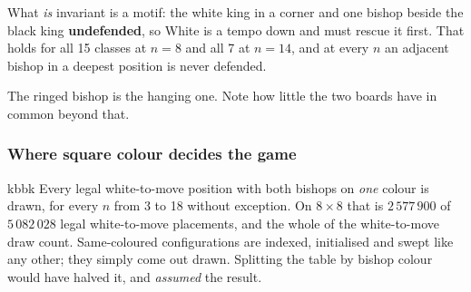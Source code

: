 \documentclass[10pt]{article}
\begin{document}
\noindent
What \emph{is} invariant is a motif: the white king in a corner and one bishop
beside the black king \textbf{undefended}, so White is a tempo down and must
rescue it first. That holds for all 15 classes at $n=8$ and all 7 at $n=14$,
and at every $n$ an adjacent bishop in a deepest position is never defended.

\medskip
\noindent
\begin{minipage}[t]{0.36\textwidth}
\end{minipage}\hfill
\begin{minipage}[t]{0.36\textwidth}
\end{minipage}\hfill
\begin{minipage}[t]{0.24\textwidth}\vspace{0pt}\small
The ringed bishop is the hanging one. Note how little the two boards have in
common beyond that.
\end{minipage}

\subsubsection{Where square colour decides the game}\label{sub:kbbk-colour}

\begin{result}[title={Computed, not assumed}]{kbbk}
Every legal white-to-move position with both bishops on \emph{one} colour is
drawn, for every $n$ from 3 to 18 without exception. On $8\times8$ that is
$2\,577\,900$ of $5\,082\,028$ legal white-to-move placements, and the whole of
the white-to-move draw count. Same-coloured configurations are indexed,
initialised and swept like any other; they simply come out drawn. Splitting the
table by bishop colour would have halved it, and \emph{assumed} the result.
\end{result}
\end{document}
